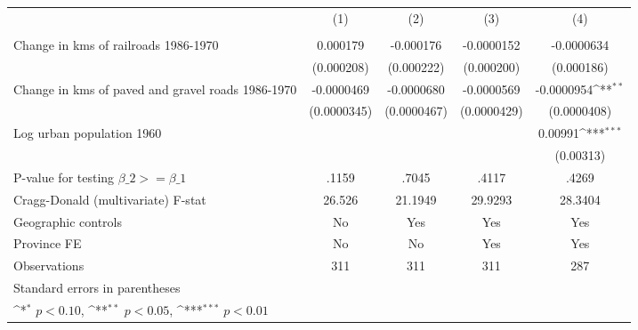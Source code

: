 {
\def\sym#1{\ifmmode^{#1}\else\(^{#1}\)\fi}
\begin{tabular}{l*{4}{c}}
\hline\hline
                &\multicolumn{1}{c}{(1)}&\multicolumn{1}{c}{(2)}&\multicolumn{1}{c}{(3)}&\multicolumn{1}{c}{(4)}\\
                &\multicolumn{1}{c}{}&\multicolumn{1}{c}{}&\multicolumn{1}{c}{}&\multicolumn{1}{c}{}\\
\hline
Change in kms of railroads 1986-1970& 0.000179         &-0.000176         &-0.0000152         &-0.0000634         \\
                &(0.000208)         &(0.000222)         &(0.000200)         &(0.000186)         \\
[1em]
Change in kms of paved and gravel roads 1986-1970&-0.0000469         &-0.0000680         &-0.0000569         &-0.0000954\sym{**} \\
                &(0.0000345)         &(0.0000467)         &(0.0000429)         &(0.0000408)         \\
[1em]
Log urban population 1960&                  &                  &                  &  0.00991\sym{***}\\
                &                  &                  &                  &(0.00313)         \\
\hline
P-value for testing $\beta\_{2} >= \beta\_{1}$&    .1159         &    .7045         &    .4117         &    .4269         \\
Cragg-Donald (multivariate) F-stat&   26.526         &  21.1949         &  29.9293         &  28.3404         \\
Geographic controls&       No         &      Yes         &      Yes         &      Yes         \\
Province FE     &       No         &       No         &      Yes         &      Yes         \\
Observations    &      311         &      311         &      311         &      287         \\
\hline\hline
\multicolumn{5}{l}{\footnotesize Standard errors in parentheses}\\
\multicolumn{5}{l}{\footnotesize \sym{*} \(p<0.10\), \sym{**} \(p<0.05\), \sym{***} \(p<0.01\)}\\
\end{tabular}
}
